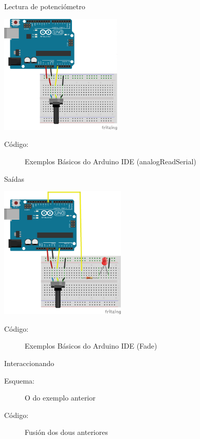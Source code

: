 \documentclass{beamer}
\begin{document}
\begin{frame}{Lectura de potenciómetro}
\begin{center}
\includegraphics[width=165pt]{./img/lecturaPote.png}
\end{center}

\begin{description}
\item[Código:] Exemplos Básicos do Arduino IDE (analogReadSerial)
\end{description}
\end{frame}

\begin{frame}{Saídas}
\begin{center}
\includegraphics[width=170pt]{./img/esquemaPoteLed.png}
\end{center}

\begin{description}
\item[Código:] Exemplos Básicos do Arduino IDE (Fade)
\end{description}
\end{frame}


\begin{frame}{Interaccionando}
\begin{description}
\item[Esquema:] O do exemplo anterior
\item[Código:] Fusión dos dous anteriores
\end{description}
\end{frame}
\end{document}
